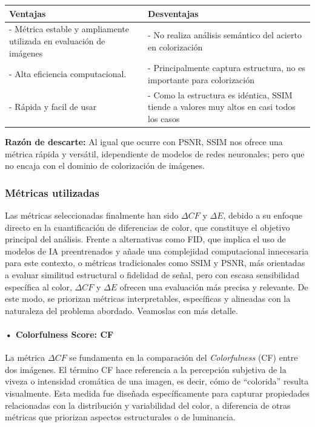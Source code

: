 \documentclass[a4paper]{article}
\begin{document}
\begin{table}[h]
	\centering
	\begin{tabular}{|p{}|p{}|}
		\hline
		\textbf{Ventajas} & \textbf{Desventajas} 
		\\ \hline
		- Métrica estable y ampliamente utilizada en evaluación de imágenes & - No realiza análisis semántico del acierto en colorización \\
		- Alta eficiencia computacional. & - Principalmente captura estructura, no es importante para colorización \\
		- Rápida y facil de usar & - Como la estructura es idéntica, SSIM tiende a valores muy altos en casi todos los casos \\ \hline
	\end{tabular}
\end{table}

\textbf{Razón de descarte:} Al igual que ocurre con PSNR, SSIM nos ofrece una métrica rápida y versátil, idependiente de modelos de redes neuronales; pero que no encaja con el dominio de colorización de imágenes.


\subsubsection{Métricas utilizadas}

Las métricas seleccionadas finalmente han sido $\Delta CF$ y $\Delta E$, debido a su enfoque directo en la cuantificación de diferencias de color, que constituye el objetivo principal del análisis. Frente a alternativas como FID, que implica el uso de modelos de IA preentrenados y añade una complejidad computacional innecesaria para este contexto, o métricas tradicionales como SSIM y PSNR, más orientadas a evaluar similitud estructural o fidelidad de señal, pero con escasa sensibilidad específica al color, $\Delta CF$ y  $\Delta E$ ofrecen una evaluación más precisa y relevante. De este modo, se priorizan métricas interpretables, específicas y alineadas con la naturaleza del problema abordado.
Veamoslas con más detalle.

\paragraph{ • Colorfulness Score: CF \cite{CF}}

La métrica $\Delta CF$ se fundamenta en la comparación del \textit{Colorfulness} (CF) entre dos imágenes. El término CF hace referencia a la percepción subjetiva de la viveza o intensidad cromática de una imagen, es decir, cómo de “colorida” resulta visualmente. Esta medida fue diseñada específicamente para capturar propiedades relacionadas con la distribución y variabilidad del color, a diferencia de otras métricas que priorizan aspectos estructurales o de luminancia.
\end{document}

